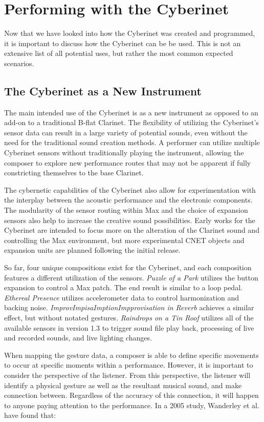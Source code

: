 \chapter{Performing with the Cyberinet}
Now that we have looked into how the Cyberinet was created and programmed, it is important to discuss how the Cyberinet can be be used. This is not an extensive list of all potential uses, but rather the most common expected scenarios.

\section{The Cyberinet as a New Instrument}
The main intended use of the Cyberinet is as a new instrument as opposed to an add-on to a traditional B-flat Clarinet. The flexibility of utilizing the Cyberinet's sensor data can result in a large variety of potential sounds, even without the need for the traditional sound creation methods. A performer can utilize multiple Cyberinet sensors without traditionally playing the instrument, allowing the composer to explore new performance routes that may not be apparent if fully constricting themselves to the base Clarinet.

The cybernetic capabilities of the Cyberinet also allow for experimentation with the interplay between the acoustic performance and the electronic components. The modularity of the sensor routing within Max and the choice of expansion sensors also help to increase the creative sound possibilities. Early works for the Cyberinet are intended to focus more on the alteration of the Clarinet sound and controlling the Max environment, but more experimental CNET objects and expansion units are planned following the initial release.

So far, four unique compositions exist for the Cyberinet, and each composition features a different utilization of the sensors. \textit{Puzzle of a Park} utilizes the button expansion to control a Max patch. The end result is similar to a loop pedal. \textit{Ethereal Presence} utilizes accelerometer data to control harmonization and backing noise. \textit{ImprovImpisaImptionImpprovisation in Reverb} achieves a similar effect, but without notated gestures. \textit{Raindrops on a Tin Roof} utilizes all of the available sensors in version 1.3 to trigger sound file play back, processing of live and recorded sounds, and live lighting changes.

When mapping the gesture data, a composer is able to define specific movements to occur at specific moments within a performance. However, it is important to consider the perspective of the listener\cite{KvifteJenseniusDescription}. From this perspective, the listener will identify a physical gesture as well as the resultant musical sound, and make connection between. Regardless of the accuracy of this connection, it will happen to anyone paying attention to the performance. In a 2005 study, Wanderley et al. have found that:

